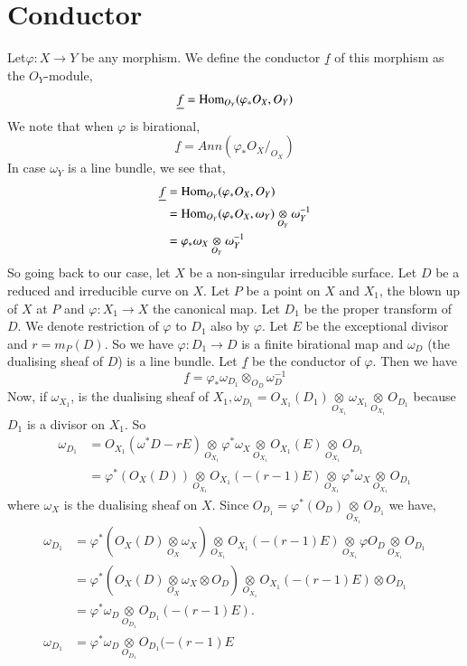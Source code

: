 \section{Conductor}\label{chap2:sec5}
 Let\pageoriginale $\varphi :X\to
Y$ be any morphism. We define the conductor $\underline{f}$ of this
morphism as the $O_Y$-module,
$$
\underline{f} = \operatorname{Hom}_{O_Y}(\varphi_*O_X,O_Y)
$$
We note that when $\varphi$ is birational,
$$
\underline{f}= Ann(\varphi_*O_X/_{O_X})
$$
In case $\omega_Y$ is a line bundle, we see that,
\begin{align*}
\underline{f} &=\operatorname{Hom}_{O_Y}(\varphi_*O_X,O_Y)\\
&= \operatorname{Hom}_{O_Y}(\varphi_*O_X,\omega_Y)\underset{O_Y}{\otimes}
\omega_Y^{-1}\\
&= \varphi_*\omega_X\underset{O_Y}{\otimes}\omega_Y^{-1}
\end{align*}
So going back to our case, let $X$ be a non-singular irreducible
surface. Let $D$ be a reduced and irreducible curve on $X$. Let $P$ be
a point on $X$ and $X_1$, the blown up of $X$ at $P$ and $\varphi:X_1
\longrightarrow X$ the canonical map. Let $D_1$ be the proper
transform of $D$. We denote restriction of $\varphi$ to $D_1$ also by
$\varphi$. Let $E$ be the exceptional divisor and $r=m_P(D)$. So we
have $\varphi:D_1\longrightarrow D$ is a finite birational map and
$\omega_D$ (the dualising sheaf of $D$) is a line bundle. Let
$\underline{f}$ be the conductor of $\varphi$. Then we have 
$$
\underline{f}=\varphi_*\omega_{D_1}\otimes_{O_D}\omega_D^{-1}
$$
Now, if $\omega_{X_1}$, is the dualising sheaf of $X_1, \omega_{D_1}=
O_{X_1}(D_1)\underset{O_{X_1}}{\otimes}\omega_{X_1} \underset{O_{X_1}}
{\otimes}O_{D_1}$ because $D_1$ is a divisor on $X_1$. So
\begin{align*}
\omega_{D_1} &= O_{X_1}(\omega^*D-rE)\underset{O_{X_1}}{\otimes}
\varphi^*\omega_X\underset{O_{X_1}}{\otimes}O_{X_1}(E)
\underset{O_{X_1}}{\otimes}O_{D_1}\\
&= \varphi^*(O_{X}(D))\underset{O_{X_1}}{\otimes}O_{X_1}(-(r-1)E)
\underset{O_{X_1}}{\otimes}\varphi^*\omega_X
\underset{O_{X_1}}{\otimes}O_{D_1}
\end{align*}\pageoriginale
where $\omega_X$ is the dualising sheaf on $X$. Since
$O_{D_1}= \varphi^*(O_D)\underset{O_{X_1}}{\otimes}O_{D_1}$ we have, 
\begin{align*}
\omega_{D_1} &= \varphi^*(O_X(D)\underset{O_{X}}{\otimes}\omega_X)
\underset{O_{X_1}}{\otimes}O_{X_1}(-(r-1)E)\underset{O_{X_1}}{\otimes}
\varphi O_D\underset{O_{X_1}}{\otimes}O_{D_1}\\
&= \varphi^*(O_X(D)\underset{O_X}{\otimes}\omega_X\otimes O_D)
\underset{O_{X_1}}{\otimes}O_{X_1}(-(r-1)E)\otimes O_{D_1}\\
&= \varphi^*\omega_D\underset{O_{D_1}}{\otimes}O_{D_1}(-(r-1)E).\\
\omega_{D_1} &= \varphi^*\omega_D\underset{O_{D_1}}{\otimes} O_{D_1} (-(r-1)E
\end{align*}

